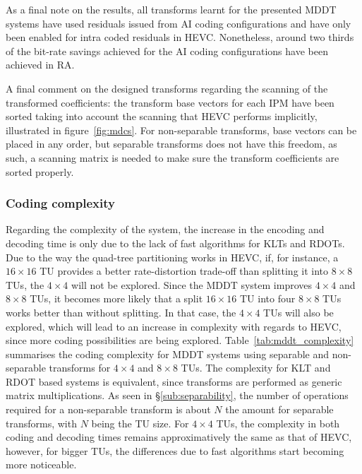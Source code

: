 \documentclass[11pt,a4paper,openright,twoside]{book}
\numberwithin{equation}{section} %
\numberwithin{figure}{section} %
\numberwithin{table}{section} %
\begin{document}
As a final note on the results, all transforms learnt for the presented
\ac{MDDT} systems have used residuals issued from \ac{AI} coding
configurations and have only been enabled for intra coded residuals in
\ac{HEVC}.
Nonetheless, around two thirds of the bit-rate savings achieved for the
\ac{AI} coding configurations have been achieved in \ac{RA}.

A final comment on the designed transforms regarding the scanning of the
transformed coefficients:
the transform base vectors for each \ac{IPM} have been sorted taking into
account the scanning that \ac{HEVC} performs implicitly, illustrated in
figure~\ref{fig:mdcs}.
For non-separable transforms, base vectors can be placed in any order, but
separable transforms does not have this freedom, as such, a scanning matrix is
needed to make sure the transform coefficients are sorted properly.

\subsubsection{Coding complexity}
\label{ssub:mddt_coding_complexity}

Regarding the complexity of the system, the increase in the encoding and
decoding time is only due to the lack of fast algorithms for \acp{KLT} and
\acp{RDOT}.
Due to the way the quad-tree partitioning works in \ac{HEVC}, if, for
instance, a $16\times16$ \ac{TU} provides a better rate-distortion trade-off
than splitting it into $8\times8$ \acp{TU}, the $4\times4$ will not be
explored.
Since the \ac{MDDT} system improves $4\times4$ and $8\times8$ \acp{TU}, it
becomes more likely that a split $16\times16$ \ac{TU} into four $8\times8$
\acp{TU} works better than without splitting.
In that case, the $4\times4$ \acp{TU} will also be explored, which will lead
to an increase in complexity with regards to \ac{HEVC}, since more coding
possibilities are being explored.
Table~\ref{tab:mddt_complexity} summarises the coding complexity for \ac{MDDT}
systems using separable and non-separable transforms for $4\times4$ and
$8\times8$ \acp{TU}.
The complexity for \ac{KLT} and \ac{RDOT} based systems is equivalent, since
transforms are performed as generic matrix multiplications.
As seen in \S\ref{sub:separability}, the number of operations required for a
non-separable transform is about $N$ the amount for separable transforms, with
$N$ being the \ac{TU} size.
For $4\times4$ \acp{TU}, the complexity in both coding and decoding times
remains approximatively the same as that of \ac{HEVC}, however, for bigger
\acp{TU}, the differences due to fast algorithms start becoming more
noticeable.
\end{document}
